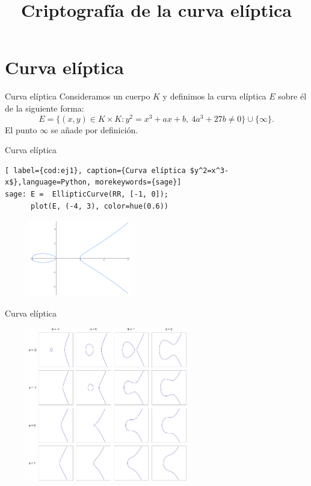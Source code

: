 \documentclass[12pt]{beamer}
\title{Criptografía de la curva elíptica}
\author[Author One at al.]{\makebox[0pt]{Sofía Almeida \and Pedro Flores \and Victoria Granados}}
\begin{document}
\frame{\titlepage}

\frame{\tableofcontents}

\section{Curva elíptica}\label{curva}
\large
\begin{frame}[fragile]{Curva elíptica}
  Consideramos un cuerpo $K$ y definimos la curva elíptica $E$ sobre él de la siguiente forma:
\normalsize
\[E = \{(x,y) \in K\times K : y^2 = x^3 + ax +b,\ 4a^3+27b \neq 0\} \cup \{\infty\}.
\]
\large
El punto $\infty$ se añade por definición.
\end{frame}

\begin{frame}[fragile]{Curva elíptica}
\begin{lstlisting}[ label={cod:ej1}, caption={Curva elíptica $y^2=x^3-x$},language=Python, morekeywords={sage}]
sage: E =  EllipticCurve(RR, [-1, 0]);
      plot(E, (-4, 3), color=hue(0.6))
\end{lstlisting}

\begin{figure}[H]
    \centering
    \includegraphics[height=0.4\textwidth, width=0.4\textwidth]{ej1}
    \label{fig:ej1}
\end{figure}

\end{frame}

\begin{frame}[fragile]{Curva elíptica}
\begin{figure}[H]
    \centering
    \includegraphics[width=0.62\textwidth]{EllipticCurveCatalog}
    \label{fig:EllipticCurveCatalog}
\end{figure}
\end{frame}
\end{document}
